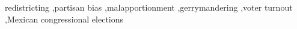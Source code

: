 \documentclass[preprint,authoryear,letter,12pt]{elsarticle} %
\begin{document}
\begin{keyword}
redistricting \sep partisan bias \sep malapportionment \sep gerrymandering \sep voter turnout \sep Mexican congressional elections
\end{keyword}

\maketitle
\end{document}
